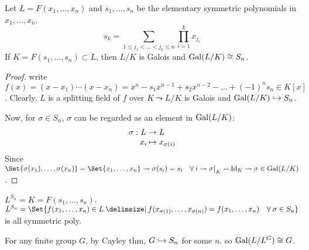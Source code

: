\begin{lemma} \label{lemma:symm-poly-symm-group}
  Let $L = F(x_1, \dots, x_n)$ and $s_1, \dots, s_n$ be the elementary
  symmetric polynomials in $x_1, \dots, x_n$.
  \[
    s_k = \sum_{1 \le j_1 < \dots < j_k \le n} \prod_{i=1}^k x_{j_i}
  \]
  If $K = F(s_1, \dots, s_n) \subset L$, then $L/K$ is Galois and
  $\operatorname{Gal}(L/K) \cong S_n$.

  \begin{proof}
    write $f(x) = (x - x_1) \cdots (x - x_n) = x^n - s_1x^{n-1} + s_2x^{n-2} -
    \dots + (-1)^ns_n \in K[x]$.
    Clearly, $L$ is a splitting field of $f$ over $K \leadsto L/K$ is Galois
    and $\operatorname{Gal}(L/K) \hookrightarrow S_n$.

    Now, for $\sigma \in S_n$, $\sigma$ can be regarded as an element in
    $\operatorname{Gal}(L/K)$:
    \[
      \arraycolsep=1pt
      \begin{array}{rcl}
        \sigma: & L & \to L \\
                & x_i & \mapsto x_{\sigma(i)}
      \end{array}
    \]
    Since $\Set{ \sigma(x_1), \dots, \sigma(x_n) } = \Set{ x_1, \dots, x_n }
    \leadsto \sigma(s_i) = s_i \quad \forall i \leadsto \sigma\big|_K = \Id_K
    \leadsto \sigma \in \Gal(L/K)$.
  \end{proof}
\end{lemma}

\begin{coro}
  $L^{S_n} = K = F(s_1, \dots, s_n)$. \\
  $L^{S_n} = \Set{ f(x_1, \dots, x_n) \in L \given f(x_{\sigma(1)}, \dots,
  x_{\sigma(n)}) = f(x_1, \dots, x_n) \quad \forall \sigma \in S_n }$ is
  all symmetric poly.
\end{coro}

\begin{coro}
  For any finite group $G$, by Cayley thm, $G \hookrightarrow S_n$ for some $n$.
  so $\operatorname{Gal}(L/L^G) \cong G$.
\end{coro}


